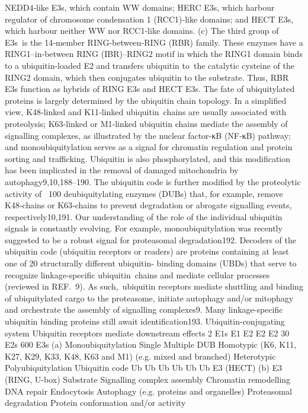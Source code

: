 NEDD4‑like E3s, which contain WW domains; HERC E3s, which harbour
regulator of chromosome condensation 1 (RCC1)‑like domains; and HECT E3s,
which harbour neither WW nor RCC1‑like domains. (c) The third group of
E3s is the 14‑member RING-between-RING (RBR) family. These enzymes have
a RING1–in‑between RING (IBR)–RING2 motif in which the RING1 domain
binds to a ubiquitin-loaded E2 and transfers ubiquitin to the catalytic cysteine
of the RING2 domain, which then conjugates ubiquitin to the substrate. Thus,
RBR E3s function as hybrids of RING E3s and HECT E3s.
The fate of ubiquitylated proteins is largely determined by the ubiquitin
chain topology. In a simplified view, K48‑linked and K11‑linked
ubiquitin chains are usually associated with proteolysis; K63‑linked or
M1‑linked ubiquitin chains mediate the assembly of signalling complexes, as
illustrated by the nuclear factor-κB (NF‑κB) pathway; and monoubiquitylation
serves as a signal for chromatin regulation and protein sorting and trafficking.
Ubiquitin is also phosphorylated, and this modification has been implicated
in the removal of damaged mitochondria by autophagy9,10,188–190. The ubiquitin
code is further modified by the proteolytic activity of ~100 deubiquitylating
enzymes (DUBs) that, for example, remove K48‑chains or K63‑chains to
prevent degradation or abrogate signalling events, respectively10,191. Our
understanding of the role of the individual ubiquitin signals is constantly
evolving. For example, monoubiquitylation was recently suggested to be a
robust signal for proteasomal degradation192.
Decoders of the ubiquitin code (ubiquitin receptors or readers) are
proteins containing at least one of 20 structurally different ubiquitin-
binding domains (UBDs) that serve to recognize linkage-specific
ubiquitin chains and mediate cellular processes (reviewed in REF. 9). As
such, ubiquitin receptors mediate shuttling and binding of ubiquitylated
cargo to the proteasome, initiate autophagy and/or mitophagy and
orchestrate the assembly of signalling complexes9. Many linkage-specific
ubiquitin binding proteins still await identification193.
Ubiquitin-conjugating system
Ubiquitin receptors mediate downstream eﬀects
2 E1s
E1
E2
E2
E2
30 E2s
600 E3s
(a)
Monoubiquitylation
Single
Multiple
DUB
Homotypic
(K6, K11, K27, K29, K33,
K48, K63 and M1)
(e.g. mixed and branched)
Heterotypic
Polyubiquitylation
Ubiquitin code
Ub
Ub
Ub
Ub
Ub
Ub
E3 (HECT)
(b)
E3 (RING, U-box)
Substrate
Signalling complex assembly
Chromatin remodelling
DNA repair
Endocytosis
Autophagy
(e.g. proteins and organelles)
Proteasomal
degradation
Protein conformation and/or activity
